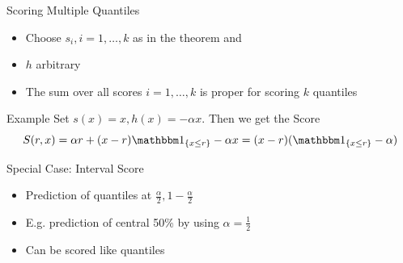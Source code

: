 \documentclass[aspectratio=43,10pt]{beamer}
\begin{document}
\begin{frame}{Scoring Multiple Quantiles}
\begin{itemize}
    \item Choose $s_i, i=1,\dots,k$ as in the theorem and
    \item $h$ arbitrary
    \item The sum over all scores $i=1,\dots,k$ is proper for scoring $k$ quantiles
\end{itemize}
\end{frame}
\begin{frame}{Example}
    Set $s(x)=x, h(x)=-\alpha x$. Then we get the Score \begin{equation*}
        S(r,x)=\alpha r+(x-r)\mathbbm 1_{\{x\leq r\}}-\alpha x=(x-r)(\mathbbm 1_{\{x\leq r\}}-\alpha)
    \end{equation*}
\end{frame}
\begin{frame}{Special Case: Interval Score}
    \begin{itemize}
        \item Prediction of quantiles at $\frac{\alpha}{2}, 1-\frac\alpha 2$
        \item E.g. prediction of central 50\% by using $\alpha=\frac12$
        \item Can be scored like quantiles
    \end{itemize}
\end{frame}
\end{document}
